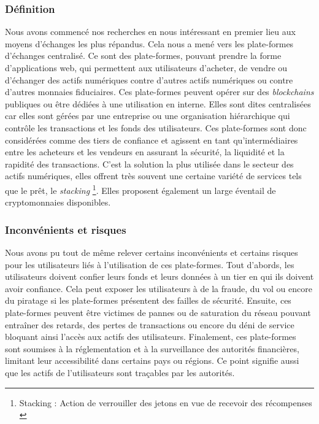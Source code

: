\subsubsection{Définition}
Nous avons commencé nos recherches en nous intéressant en premier lieu aux moyens d'échanges les plus répandus. 
Cela nous a mené vers les plate-formes d'échanges centralisé. 
Ce sont des plate-formes, pouvant prendre la forme d'applications web, qui permettent aux utilisateurs d'acheter, de vendre ou d'échanger des \gls{actif}s numériques contre d'autres \gls{actif}s numériques ou contre d'autres monnaies fiduciaires. 
Ces plate-formes peuvent opérer sur des \textit{\gls{blockchain}s} publiques ou être dédiées à une utilisation en interne. 
Elles sont dites centralisées car elles sont gérées par une entreprise ou une organisation hiérarchique qui contrôle les transactions et les fonds des utilisateurs.
Ces plate-formes sont donc considérées comme des tiers de confiance et agissent en tant qu'intermédiaires entre les acheteurs et les vendeurs en assurant la sécurité, la liquidité et la rapidité des transactions.
C'est la solution la plus utilisée dans le secteur des \gls{actif}s numériques, elles offrent très souvent une certaine variété de services tels que le prêt, le \textit{stacking} \footnote{Stacking : Action de verrouiller des jetons en vue de recevoir des récompenses \cite{defStack}}.
Elles proposent également un large éventail de cryptomonnaies disponibles.

\subsubsection{Inconvénients et risques}
Nous avons pu tout de même relever certains inconvénients et certains risques pour les utilisateurs liés à l'utilisation de ces plate-formes. 
Tout d'abords, les utilisateurs doivent confier leurs fonds et leurs données à un tier en qui ils doivent avoir confiance. 
Cela peut exposer les utilisateurs à de la fraude, du vol ou encore du piratage si les plate-formes présentent des failles de sécurité. 
Ensuite, ces plate-formes peuvent être victimes de pannes ou de saturation du réseau pouvant entraîner des retards, des pertes de transactions ou encore du déni de service bloquant ainsi l'accès aux \gls{actif}s des utilisateurs. 
Finalement, ces plate-formes sont soumises à la réglementation et à la surveillance des autorités financières, limitant leur accessibilité dans certains pays ou régions. 
Ce point signifie aussi que les \gls{actif}s de l'utilisateurs sont traçables par les autorités. 


